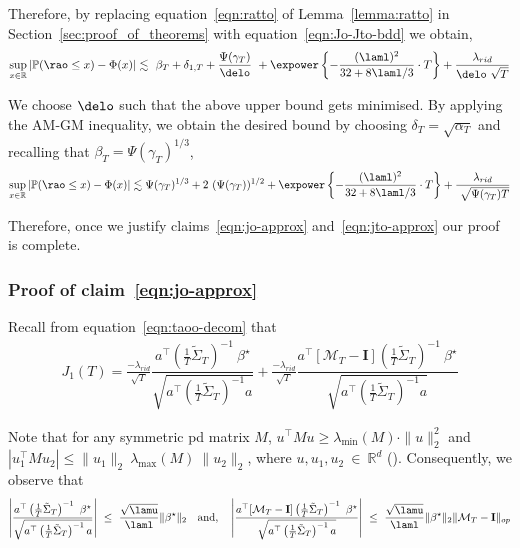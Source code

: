 \documentclass[11pt,letterpaper]{article}
\newcommand{\Prob}{\mathbb{P}}
\newcommand{\rpen}{\lambda_{rid}}
\newcommand{\real}{\mathbb{R}}
\newcommand{\Id}{\mathbf{I}}
\newcommand{\err}{\Psi(\gamma_T)}
\newcommand{\PT}{\tilde{\Sigma}_T}
\theoremstyle{plain}
\theoremstyle{definition}  %
\begin{document}
\noindent Therefore, by replacing equation~\eqref{eqn:ratto} of Lemma~\ref{lemma:ratto} in Section~\ref{sec:proof_of_theorems} with equation~\eqref{eqn:Jo-Jto-bdd} we obtain, 
\begin{align*}
    \sup_{x\in \real} |\Prob(\rao \leq x) - \Phi(x) |
    \lesssim \  \beta_T +\delta_{1,T} + \frac{\err}{\delo} \ + \expower\left\{ - \frac{(\laml)^2}{32 +  8\laml/3} \cdot  T\right\}
    + \frac{\rpen}{\delo \ \sqrt{T}} 
\end{align*}

\noindent We choose $\delo$ such that the above upper bound gets minimised.   By applying the AM-GM inequality, we obtain the desired bound by choosing $\delta_T = \sqrt{\alpha_T}$ and recalling that $\beta_T = \err^{1/3}$,
\begin{align*}
    \sup_{x\in \real} |\Prob(\rao \leq x) - \Phi(x) |
    \lesssim \err^{1/3} + 2 \ (\err)^{1/2}
    + \expower\left\{ - \frac{(\laml)^2}{32 +  8\laml/3} \cdot  T\right\}
    + \frac{\rpen}{ \ \sqrt{\err T}} 
\end{align*}

\noindent Therefore, once we justify claims~\eqref{eqn:jo-approx} and~\eqref{eqn:jto-approx} our proof is complete.

\subsubsection*{Proof of claim~\eqref{eqn:jo-approx}}

\noindent Recall from equation~\eqref{eqn:taoo-decom} that
\begin{align*}
   J_1(T)  
   =\frac{-\rpen}{\sqrt{T}} \dfrac{a^\top  \left( \frac{1}{T} \PT \right)^{-1} \ \beta^\star}{\sqrt{a^\top  \left( \frac{1}{T} \PT \right)^{-1}  a}}  
   + \frac{-\rpen}{\sqrt{T}} \dfrac{a^\top [\mathcal{M}_T - \Id] \left( \frac{1}{T} \PT  \right)^{-1} \ \beta^\star }{\sqrt{a^\top  \left( \frac{1}{T} \PT \right)^{-1}  a}}  
\end{align*}

\noindent Note that for any symmetric pd matrix $M$, $u^\top M u \geq \lambda_{\min}(M) \cdot \| u\|^2_2$ and $|u_1^{\top}M u_2| \leq \| u_1\|_2 \  \lambda_{\max}(M) \ \| u_2\|_2$, where $u, u_1, u_2 \ \in \ \real^d$ (\citet{rao2000linear}). Consequently, we observe that
\begin{align*}
    \left|\frac{a^\top  \left( \frac{1}{T} \PT \right)^{-1} \ \beta^\star}{\sqrt{a^\top  \left( \frac{1}{T} \PT \right)^{-1}  a}}  \right| 
    \ \leq \ \frac{\sqrt{\lamu}}{\laml} \| \beta^\star\|_2
    \quad \text{and,} \quad 
    \left|\frac{a^\top [\mathcal{M}_T - \Id] \left( \frac{1}{T} \PT \right)^{-1} \ \beta^\star}{\sqrt{a^\top  \left( \frac{1}{T} \PT \right)^{-1}  a}}  \right| 
    \ \leq \ \frac{\sqrt{\lamu}}{\laml} \| \beta^\star\|_2 \|\mathcal{M}_T - \Id \|_{op}
\end{align*}
\end{document}
